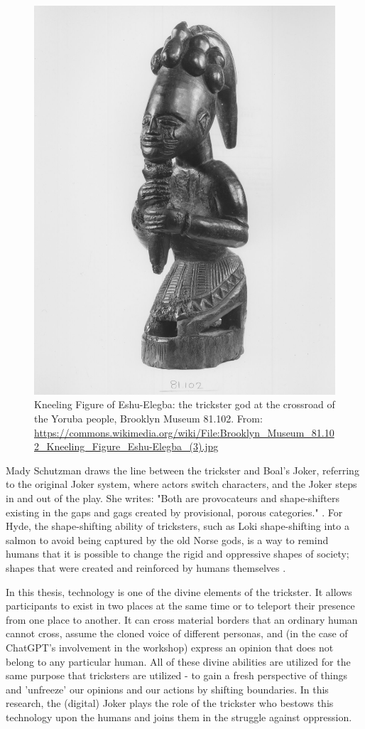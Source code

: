 \documentclass[dissertation,math,vertlayout,pdfa,colorlinks]{aaltoseries}
\begin{document}
\begin{figure}
    \centering
    \includegraphics[width=0.5\linewidth]{eshu.jpeg}
    \caption{Kneeling Figure of Eshu-Elegba: the trickster god at the crossroad of the Yoruba people, Brooklyn Museum 81.102. From: \url{https://commons.wikimedia.org/wiki/File:Brooklyn_Museum_81.102_Kneeling_Figure_Eshu-Elegba_(3).jpg}}
    \label{fig:eshu}
\end{figure}

Mady Schutzman draws the line between the trickster and Boal's Joker, referring to the original Joker system, where actors switch characters, and the Joker steps in and out of the play. She writes: "Both are provocateurs and shape-shifters existing in the gaps and gags created by provisional, porous categories." \cite[p. 97]{schutzmanRadicalDoubtJoker2018}. For Hyde, the shape-shifting ability of tricksters, such as Loki shape-shifting into a salmon to avoid being captured by the old Norse gods, is a way to remind humans that it is possible to change the rigid and oppressive shapes of society; shapes that were created and reinforced by humans themselves \cite[c. 11]{hydeTricksterMakesThis2017}.

In this thesis, technology is one of the divine elements of the trickster. It allows participants to exist in two places at the same time or to teleport their presence from one place to another. It can cross material borders that an ordinary human cannot cross, assume the cloned voice of different personas, and (in the case of ChatGPT's involvement in the workshop) express an opinion that does not belong to any particular human. All of these divine abilities are utilized for the same purpose that tricksters are utilized - to gain a fresh perspective of things and 'unfreeze' our opinions and our actions by shifting boundaries. In this research, the (digital) Joker plays the role of the trickster who bestows this technology upon the humans and joins them in the struggle against oppression. 
\end{document}
